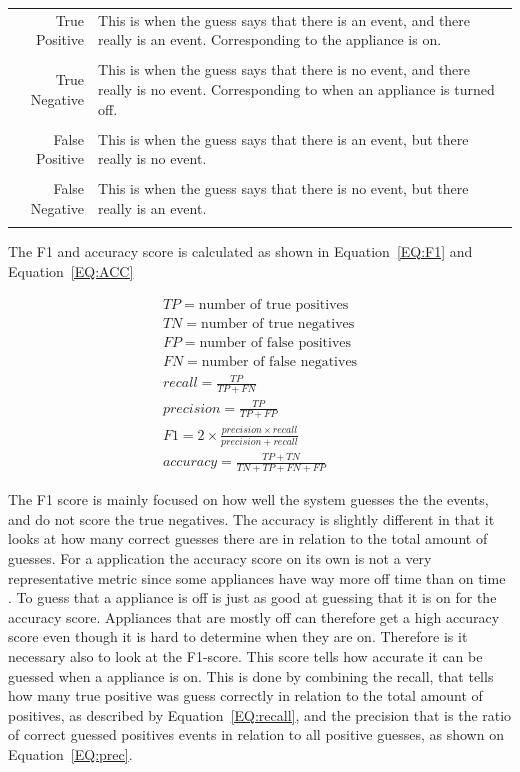\begin{tabularx}{\linewidth}{ r X }
True Positive& This is when the guess says that there is an event, and there really is an event. Corresponding to the appliance is on. \\
\\
True Negative&This is when the guess says that there is no event, and there really is no event. Corresponding to when an appliance is turned off. \\
\\
False Positive& This is when the guess says that there is an event, but there really is no event. \\
\\
False Negative&This is when the guess says that there is no event, but there really is an event. \\\\
\end{tabularx}
The F1 and accuracy score is calculated as shown in Equation~\ref{EQ:F1} and Equation~\ref{EQ:ACC}

\begin{gather}
		TP = \text{number of true positives} \\
		TN = \text{number of true negatives} \\
		FP = \text{number of false positives} \\
		FN = \text{number of false negatives} \\
		recall = \frac{TP}{TP+FN} \label{EQ:recall}\\
		precision = \frac{TP}{TP+FP} \label{EQ:prec} \\
		F1 = 2 \times \frac{precision \times recall}{precision + recall} \label{EQ:F1}\\
		accuracy = \frac{TP+TN}{TN+TP+FN+FP} \label{EQ:ACC}
\end{gather}

The F1 score is mainly focused on how well the system guesses the the events, and do not score the true negatives. The accuracy is slightly different in that it looks at how many correct guesses there are in relation to the total amount of guesses. For a  application the accuracy score on its own is not a very representative metric since some appliances have way more off time than on time \citep{RefWorks:35}. To guess that a appliance is off is just as good at guessing that it is on for the accuracy score. Appliances that are mostly off can therefore get a high accuracy score even though it is hard to determine when they are on. Therefore is it necessary also to look at the F1-score. This score tells how accurate it can be guessed when a appliance is on. This is done by combining the recall, that tells how many true positive was guess correctly in relation to the total amount of positives, as described by Equation~\ref{EQ:recall}, and the precision that is the ratio of correct guessed positives events in relation to all positive guesses, as shown on Equation~\ref{EQ:prec}. 


